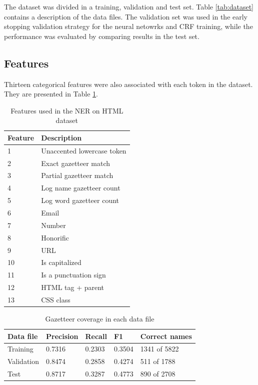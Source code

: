 \documentclass[sigconf]{acmart}
\begin{document}
The dataset was divided in a training, validation and test set. Table \ref{tab:dataset} contains
a description of the data files. The validation set was used in the early stopping validation strategy
for the neural netowrks and CRF training, while the performance was evaluated by comparing results in the test set.

\subsection{Features}

Thirteen categorical features were also associated with each token in the dataset. They 
are presented in Table \ref{tab:features}.

\begin{table}[h]
  \small
  \begin{center}
    \begin{tabular}{ ll }
      \toprule
      Feature & Description \\
      \midrule
      1  & Unaccented lowercase token \\
      2  & Exact gazetteer match \\
      3  & Partial gazetteer match \\
      4  & Log name gazetteer count\\
      5  & Log word gazetteer count\\
      6  & Email \\
      7  & Number \\
      8  & Honorific \\
      9  & URL \\
      10 & Is capitalized \\
      11 & Is a punctuation sign \\
      12 & HTML tag + parent \\
      13 & CSS class \\
      \bottomrule
    \end{tabular}
  \end{center}
  \caption{Features used in the NER on HTML dataset}
  \label{tab:features}
\end{table}

\begin{table}[h]
  \small
  \begin{center}
    \begin{tabular}{ lllll }
      \toprule
      Data file & Precision & Recall & F1 & Correct names \\
      \midrule
      Training   & 0.7316 & 0.2303 & 0.3504 & 1341 of 5822 \\ 
      Validation & 0.8474 & 0.2858 & 0.4274 & 511 of 1788 \\ 
      Test       & 0.8717 & 0.3287 & 0.4773 & 890 of 2708 \\ 
      \bottomrule
    \end{tabular}
  \end{center}
  \caption{Gazetteer coverage in each data file}
  \label{tab:gazetteer}
\end{table}
\end{document}
